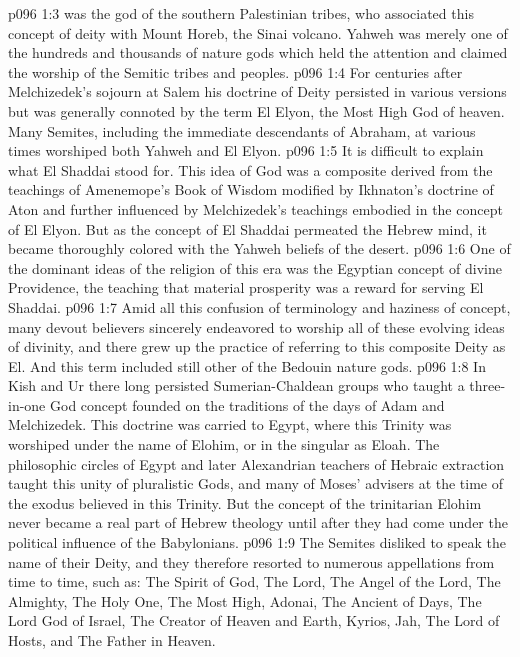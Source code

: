 \pc \vs p096 1:3 \bibnobreakspace {} was the god of the southern Palestinian tribes, who associated this concept of deity with Mount Horeb, the Sinai volcano. Yahweh was merely one of the hundreds and thousands of nature gods which held the attention and claimed the worship of the Semitic tribes and peoples.
\pc \vs p096 1:4 \bibnobreakspace {} For centuries after Melchizedek’s sojourn at Salem his doctrine of Deity persisted in various versions but was generally connoted by the term El Elyon, the Most High God of heaven. Many Semites, including the immediate descendants of Abraham, at various times worshiped both Yahweh and El Elyon.
\pc \vs p096 1:5 \bibnobreakspace {} It is difficult to explain what El Shaddai stood for. This idea of God was a composite derived from the teachings of Amenemope’s Book of Wisdom modified by Ikhnaton’s doctrine of Aton and further influenced by Melchizedek’s teachings embodied in the concept of El Elyon. But as the concept of El Shaddai permeated the Hebrew mind, it became thoroughly colored with the Yahweh beliefs of the desert.
\vs p096 1:6 One of the dominant ideas of the religion of this era was the Egyptian concept of divine Providence, the teaching that material prosperity was a reward for serving El Shaddai.
\pc \vs p096 1:7 \bibnobreakspace {} Amid all this confusion of terminology and haziness of concept, many devout believers sincerely endeavored to worship all of these evolving ideas of divinity, and there grew up the practice of referring to this composite Deity as El. And this term included still other of the Bedouin nature gods.
\pc \vs p096 1:8 \bibnobreakspace {} In Kish and Ur there long persisted Sumerian\hyp{}Chaldean groups who taught a three\hyp{}in\hyp{}one God concept founded on the traditions of the days of Adam and Melchizedek. This doctrine was carried to Egypt, where this Trinity was worshiped under the name of Elohim, or in the singular as Eloah. The philosophic circles of Egypt and later Alexandrian teachers of Hebraic extraction taught this unity of pluralistic Gods, and many of Moses’ advisers at the time of the exodus believed in this Trinity. But the concept of the trinitarian Elohim never became a real part of Hebrew theology until after they had come under the political influence of the Babylonians.
\pc \vs p096 1:9 \bibnobreakspace {} The Semites disliked to speak the name of their Deity, and they therefore resorted to numerous appellations from time to time, such as: The Spirit of God, The Lord, The Angel of the Lord, The Almighty, The Holy One, The Most High, Adonai, The Ancient of Days, The Lord God of Israel, The Creator of Heaven and Earth, Kyrios, Jah, The Lord of Hosts, and The Father in Heaven.
